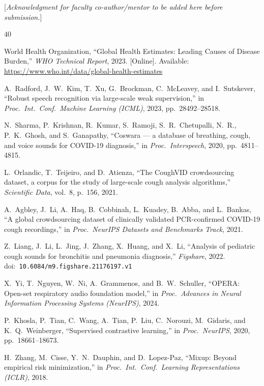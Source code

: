 \documentclass[10pt,journal,compsoc]{IEEEtran}
\begin{document}
[\textit{Acknowledgment for faculty co-author/mentor to be added here before
submission.}]

\begin{thebibliography}{40}

World Health Organization, ``Global Health Estimates: Leading Causes of
Disease Burden,'' \textit{WHO Technical Report}, 2023.
[Online]. Available: \url{https://www.who.int/data/global-health-estimates}

A.~Radford, J.~W.~Kim, T.~Xu, G.~Brockman, C.~McLeavey, and I.~Sutskever,
``Robust speech recognition via large-scale weak supervision,''
in \textit{Proc.\ Int.\ Conf.\ Machine Learning (ICML)}, 2023,
pp.\ 28492--28518.

N.~Sharma, P.~Krishnan, R.~Kumar, S.~Ramoji, S.~R.~Chetupalli,
N.~R., P.~K.~Ghosh, and S.~Ganapathy,
``Coswara --- a database of breathing, cough, and voice sounds for
COVID-19 diagnosis,''
in \textit{Proc.\ Interspeech}, 2020, pp.\ 4811--4815.

L.~Orlandic, T.~Teijeiro, and D.~Atienza,
``The CoughVID crowdsourcing dataset, a corpus for the study of
large-scale cough analysis algorithms,''
\textit{Scientific Data}, vol.\ 8, p.\ 156, 2021.

A.~Agbley, J.~Li, A.~Haq, B.~Cobbinah, L.~Kuadey, B.~Abba, and L.~Bankas,
``A global crowdsourcing dataset of clinically validated PCR-confirmed
COVID-19 cough recordings,''
in \textit{Proc.\ NeurIPS Datasets and Benchmarks Track}, 2021.

Z.~Liang, J.~Li, L.~Jing, J.~Zhang, X.~Huang, and X.~Li,
``Analysis of pediatric cough sounds for bronchitis and pneumonia
diagnosis,'' \textit{Figshare}, 2022.
doi:~\texttt{10.6084/m9.figshare.21176197.v1}

X.~Yi, T.~Nguyen, W.~Ni, A.~Grammenos, and B.~W.~Schuller,
``OPERA: Open-set respiratory audio foundation model,''
in \textit{Proc.\ Advances in Neural Information Processing Systems
(NeurIPS)}, 2024.

P.~Khosla, P.~Tian, C.~Wang, A.~Tian, P.~Liu, C.~Norouzi,
M.~Gidaris, and K.~Q.~Weinberger,
``Supervised contrastive learning,''
in \textit{Proc.\ NeurIPS}, 2020, pp.\ 18661--18673.

H.~Zhang, M.~Cisse, Y.~N.~Dauphin, and D.~Lopez-Paz,
``Mixup: Beyond empirical risk minimization,''
in \textit{Proc.\ Int.\ Conf.\ Learning Representations (ICLR)}, 2018.


\end{thebibliography}
\end{document}
